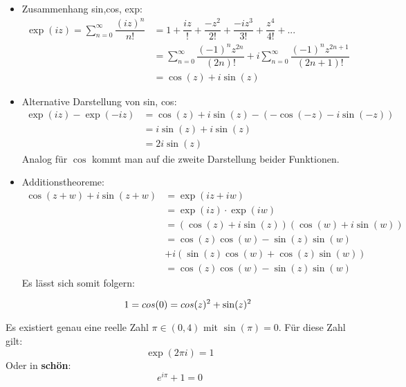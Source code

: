 \documentclass[main.tex]{subfiles}
\begin{document}
\begin{Beweis}
  \begin{itemize}
    \item Zusammenhang sin,cos, exp:
      $$\begin{aligned}
        \exp(iz) = \sum \limits_{n=0}^\infty \dfrac{(iz)^n}{n!} &= 1 + \dfrac{iz}{!} + \dfrac{-z^2}{2!} + \dfrac{-iz^3}{3!} + \dfrac{z^4}{4!} + ... \\
        &= \sum \limits_{n=0}^\infty \dfrac{(-1)^nz^{2n}}{(2n)!} + i \sum \limits_{n=0}^\infty \dfrac{(-1)^nz^{2n+1}}{(2n+1)!}\\
        &= \cos(z) + i \sin(z)
      \end{aligned}$$
    \item Alternative Darstellung von sin, cos:
      $$\begin{aligned}
        \exp(iz) - \exp(-iz) &= \cos(z) + i \sin(z) - (-\cos(-z) - i \sin(-z))\\
        &= i \sin(z) + i \sin(z)\\
        &= 2i \sin(z)
      \end{aligned}$$
      Analog für $\cos$ kommt man auf die zweite Darstellung beider Funktionen.
    \item Additionstheoreme:
      $$\begin{aligned}
        \cos(z+w) + i \sin(z+w) & = \exp (iz + iw)\\
        & = \exp(iz) \cdot \exp(iw) \\
        & = (\cos(z) + i \sin(z))(\cos(w)+i\sin(w))\\
        & = \cos(z)\cos(w) - \sin(z)\sin(w)\\
        & + i (\sin(z)\cos(w) + \cos(z)\sin(w))\\
        & = \cos(z)\cos(w) - \sin(z)\sin(w)
      \end{aligned}$$
      Es lässt sich somit folgern:
      \begin{Theorem}[Kreisgleichung]
        $$1 = \\cos(0) = \\cos(z)^2 + \sin(z)^2$$
      \end{Theorem}
  \end{itemize}
\end{Beweis}

\begin{Theorem}
  Es existiert genau eine reelle Zahl $π \in (0,4)$ mit $\sin(π) = 0$. Für diese Zahl gilt:
  $$\exp(2π i) = 1$$
  Oder in \textbf{schön}:
  $$e^{i π} + 1 = 0$$
\end{Theorem}
\end{document}
